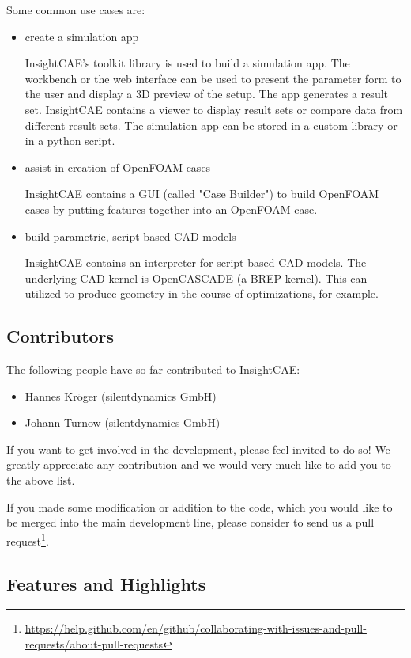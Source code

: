 Some common use cases are:
\begin{itemize}
\item create a simulation app

InsightCAE's toolkit library is used to build a simulation app. The workbench or the web interface can be used to present the parameter form to the user and display a 3D preview of the setup. The app generates a result set. InsightCAE contains a viewer to display result sets or compare data from different result sets. The simulation app can be stored in a custom library or in a python script.

\item assist in creation of OpenFOAM cases

InsightCAE contains a GUI (called "Case Builder") to build OpenFOAM cases by putting features together into an OpenFOAM case.

\item build parametric, script-based CAD models

InsightCAE contains an interpreter for script-based CAD models. The underlying CAD kernel is OpenCASCADE (a BREP kernel). 
This can utilized to produce geometry in the course of optimizations, for example.
\end{itemize}

\subsection{Contributors}

The following people have so far contributed to InsightCAE:
\begin{itemize}
\item Hannes Kröger (silentdynamics GmbH)
\item Johann Turnow (silentdynamics GmbH)
\end{itemize}

If you want to get involved in the development, please feel invited to do so!
We greatly appreciate any contribution and we would very much like to add you to the above list.

If you made some modification or addition to the code, which you would like to be merged into the main development line, please consider to send us a pull request\footnote{\url{https://help.github.com/en/github/collaborating-with-issues-and-pull-requests/about-pull-requests}}.

\subsection{Features and Highlights}

